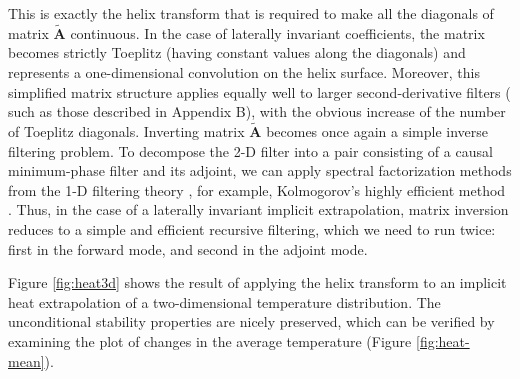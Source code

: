 \par
This is exactly the helix transform that is required to make all the
diagonals of matrix $\tilde{\mathbf{A}}$ continuous. In the case of
laterally invariant coefficients, the matrix becomes strictly Toeplitz
(having constant values along the diagonals) and represents a
one-dimensional convolution on the helix surface. Moreover, this
simplified matrix structure applies equally well to larger
second-derivative filters ( such as those described in Appendix B),
with the obvious increase of the number of Toeplitz diagonals.
Inverting matrix $\tilde{\mathbf{A}}$ becomes once again a simple
inverse filtering problem.  To decompose the 2-D filter into a pair
consisting of a causal minimum-phase filter and its adjoint, we can
apply spectral factorization methods from the 1-D filtering theory
\cite[]{Claerbout.blackwell.76,Claerbout.blackwell.92}, for example,
Kolmogorov's highly efficient method \cite[]{kolmog}. Thus, in the case
of a laterally invariant implicit extrapolation, matrix inversion
reduces to a simple and efficient recursive filtering, which we need
to run twice: first in the forward mode, and second in the adjoint
mode.


\par
Figure \ref{fig:heat3d} shows the result of applying the helix
transform to an implicit heat extrapolation of a two-dimensional
temperature distribution. The unconditional stability properties are
nicely preserved, which can be verified by examining the plot of
changes in the average temperature (Figure \ref{fig:heat-mean}).

